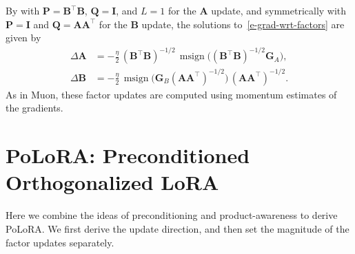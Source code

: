 \documentclass[11pt]{article}
\newcommand{\mat}[1]{\bm{#1}}
\DeclareMathOperator{\msign}{msign}          %
\newcommand{\methodname}{PoLoRA\xspace}
\begin{document}
By  with $\mat{P}=\mat{B}^\top \mat{B}$, $\mat{Q}=\mat{I}$, and $L=1$ for the $\mat{A}$ update, and symmetrically with $\mat{P}=\mat{I}$ and $\mat{Q}=\mat{A}\mat{A}^\top$ for the $\mat{B}$ update, the solutions to~\eqref{e-grad-wrt-factors} are given by
\begin{equation}\label{eq:product-muon-step}
\begin{aligned}
    \Delta\mat{A} &= -\tfrac{\eta}{2}\,(\mat{B}^\top \mat{B})^{-1/2}\,\msign\!\big((\mat{B}^\top \mat{B})^{-1/2} \mat{G}_A\big), \\
    \Delta\mat{B} &= -\tfrac{\eta}{2}\,\msign\!\big(\mat{G}_B (\mat{A} \mat{A}^\top)^{-1/2}\big)\,(\mat{A} \mat{A}^\top)^{-1/2}.
\end{aligned}
\end{equation}
As in Muon, these factor updates are computed using momentum estimates of the gradients.
\section{\texorpdfstring{\methodname{}}{PoLoRA}: Preconditioned Orthogonalized LoRA}

\label{sec:method}

Here we combine the ideas of preconditioning and product-awareness to derive \methodname{}. We first derive the update direction, and then set the magnitude of the factor updates separately.
\end{document}
